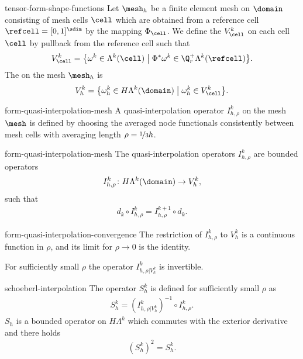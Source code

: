 \begin{Definition}{tensor-form-shape-functions}
  Let $\mesh_h$ be a finite element mesh on $\domain$ consisting of
  mesh cells $\cell$ which are obtained from a reference cell
  $\refcell = [0,1]^\sdim$ by the mapping $\Phi_\cell$. We define the
   $V_\cell^k$ on each cell $\cell$ by
  pullback from the reference cell such that
  \begin{gather}
    V_\cell^k = \bigl\{ \omega^k\in \Lambda^k(\cell) \;\big\vert\;
    \Phi^* \omega^k \in \Q_r^+\Lambda^k(\refcell) \bigr\}.
  \end{gather}
  The  on the mesh $\mesh_h$ is
  \begin{gather}
    V_h^k = \bigl\{\omega_h^k \in H\Lambda^k(\domain)\;\big\vert\;
    \omega_h^k \in V_\cell^k \bigr\}.
  \end{gather}
\end{Definition}

\begin{Definition}{form-quasi-interpolation-mesh}
  A quasi-interpolation operator $I_{h,\rho}^k$ on the mesh $\mesh$ is defined by
  choosing the averaged node functionals consistently between mesh
  cells with averaging length $\rho = \nicefrac13 h$.
\end{Definition}

\begin{Corollary}{form-quasi-interpolation-mesh}
  The quasi-interpolation operators $I_{h,\rho}^k$ are bounded operators
  \begin{gather}
    I_{h,\rho}^k \colon H\Lambda^k(\domain) \to V_h^k,
  \end{gather}
  such that
  \begin{gather}
    d_k \circ I_{h,\rho}^k = I_{h,\rho}^{k+1} \circ d_k.
  \end{gather}
\end{Corollary}

\begin{Lemma}{form-quasi-interpolation-convergence}
  The restriction of $I_{h,\rho}^k$ to $V_h^k$ is a continuous function
  in $\rho$, and its limit for $\rho\to0$ is the identity.

  For sufficiently small $\rho$ the operator $I_{h,\rho|V_h^k}^k$ is
  invertible.
\end{Lemma}

\begin{Definition}{schoeberl-interpolation}
  The  operator $S_h^k$ is defined for
  sufficiently small $\rho$ as
  \begin{gather}
    S_h^k = \left(I_{h,\rho|V_h^k}^k\right)^{-1} \circ I_{h,\rho}^k.
  \end{gather}
  $S_h$ is a bounded operator on $H\Lambda^k$ which commutes with the
  exterior derivative and there holds
  \begin{gather}
    \left(S_h^k\right)^2 = S_h^k.
  \end{gather}
\end{Definition}

